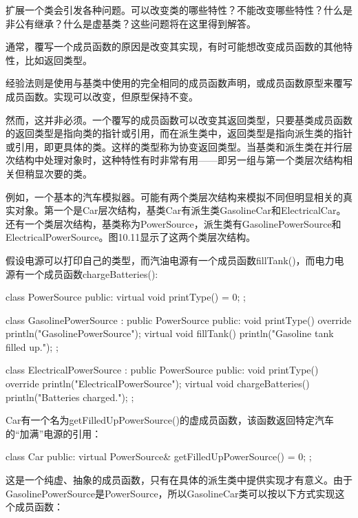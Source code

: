
扩展一个类会引发各种问题。可以改变类的哪些特性？不能改变哪些特性？什么是非公有继承？什么是虚基类？这些问题将在这里得到解答。


通常，覆写一个成员函数的原因是改变其实现，有时可能想改变成员函数的其他特性，比如返回类型。

经验法则是使用与基类中使用的完全相同的成员函数声明，或成员函数原型来覆写成员函数。实现可以改变，但原型保持不变。

然而，这并非必须。一个覆写的成员函数可以改变其返回类型，只要基类成员函数的返回类型是指向类的指针或引用，而在派生类中，返回类型是指向派生类的指针或引用，即更具体的类。这样的类型称为协变返回类型。当基类和派生类在并行层次结构中处理对象时，这种特性有时非常有用——即另一组与第一个类层次结构相关但稍显次要的类。

例如，一个基本的汽车模拟器。可能有两个类层次结构来模拟不同但明显相关的真实对象。第一个是Car层次结构，基类Car有派生类GasolineCar和ElectricalCar。还有一个类层次结构，基类称为PowerSource，派生类有GasolinePowerSource和ElectricalPowerSource。图10.11显示了这两个类层次结构。


假设电源可以打印自己的类型，而汽油电源有一个成员函数fillTank()，而电力电源有一个成员函数chargeBatteries():

\begin{cpp}
class PowerSource
{
    public:
        virtual void printType() = 0;
};

class GasolinePowerSource : public PowerSource
{
    public:
        void printType() override { println("GasolinePowerSource"); }
        virtual void fillTank() { println("Gasoline tank filled up."); }
};

class ElectricalPowerSource : public PowerSource
{
    public:
        void printType() override { println("ElectricalPowerSource"); }
        virtual void chargeBatteries() { println("Batteries charged."); }
};
\end{cpp}

Car有一个名为getFilledUpPowerSource()的虚成员函数，该函数返回特定汽车的“加满”电源的引用：

\begin{cpp}
class Car
{
    public:
        virtual PowerSource& getFilledUpPowerSource() = 0;
};
\end{cpp}

这是一个纯虚、抽象的成员函数，只有在具体的派生类中提供实现才有意义。由于GasolinePowerSource是PowerSource，所以GasolineCar类可以按以下方式实现这个成员函数：

